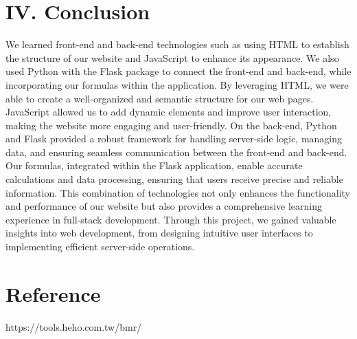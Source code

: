 \documentclass[a4paper,12pt]{article}
\begin{document}
\section*{IV. Conclusion}
\noindent
We learned front-end and back-end technologies such as using HTML to establish the structure of our website and JavaScript to enhance its appearance. We also used Python with the Flask package to connect the front-end and back-end, while incorporating our formulas within the application. By leveraging HTML, we were able to create a well-organized and semantic structure for our web pages. JavaScript allowed us to add dynamic elements and improve user interaction, making the website more engaging and user-friendly. On the back-end, Python and Flask provided a robust framework for handling server-side logic, managing data, and ensuring seamless communication between the front-end and back-end. Our formulas, integrated within the Flask application, enable accurate calculations and data processing, ensuring that users receive precise and reliable information. This combination of technologies not only enhances the functionality and performance of our website but also provides a comprehensive learning experience in full-stack development. Through this project, we gained valuable insights into web development, from designing intuitive user interfaces to implementing efficient server-side operations.
\section*{Reference}
\noindent
[1] https://tools.heho.com.tw/bmr/
\end{document}
